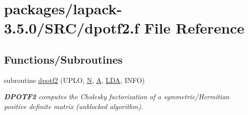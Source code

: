\hypertarget{dpotf2_8f}{}\section{packages/lapack-\/3.5.0/\+S\+R\+C/dpotf2.f File Reference}
\label{dpotf2_8f}
\subsection*{Functions/\+Subroutines}
\begin{DoxyCompactItemize}
\item 
subroutine \hyperlink{group__doublePOcomputational_ga7a5f5e88ba6f8d8d0382cac5c2c18019}{dpotf2} (U\+P\+L\+O, \hyperlink{polmisc_8c_a0240ac851181b84ac374872dc5434ee4}{N}, \hyperlink{classA}{A}, \hyperlink{example__user_8c_ae946da542ce0db94dced19b2ecefd1aa}{L\+D\+A}, I\+N\+F\+O)
\begin{DoxyCompactList}\small\item\em {\bfseries D\+P\+O\+T\+F2} computes the Cholesky factorization of a symmetric/\+Hermitian positive definite matrix (unblocked algorithm). \end{DoxyCompactList}\end{DoxyCompactItemize}
